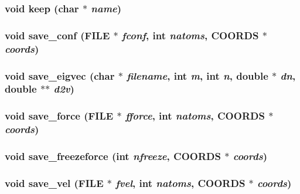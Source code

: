 \subsubsection{\setlength{\rightskip}{0pt plus 5cm}void keep (char $\ast$ {\em name})}\label{md__saveout_8c_6ece60b4480b943ce5405df2b24cc209}


\subsubsection{\setlength{\rightskip}{0pt plus 5cm}void save\_\-conf (FILE $\ast$ {\em fconf}, int {\em natoms}, {\bf COORDS} $\ast$ {\em coords})}\label{md__saveout_8c_b3f2a9aafdc9a3869217d76b4a618836}


\subsubsection{\setlength{\rightskip}{0pt plus 5cm}void save\_\-eigvec (char $\ast$ {\em filename}, int {\em m}, int {\em n}, double $\ast$ {\em dn}, double $\ast$$\ast$ {\em d2v})}\label{md__saveout_8c_be468be4405a40ab394023e376edffff}


\subsubsection{\setlength{\rightskip}{0pt plus 5cm}void save\_\-force (FILE $\ast$ {\em fforce}, int {\em natoms}, {\bf COORDS} $\ast$ {\em coords})}\label{md__saveout_8c_25bc9475fb6e336ef88f3066cb52fbdd}


\subsubsection{\setlength{\rightskip}{0pt plus 5cm}void save\_\-freezeforce (int {\em nfreeze}, {\bf COORDS} $\ast$ {\em coords})}\label{md__saveout_8c_dbbdf83279174d564c6cff04d43016c8}


\subsubsection{\setlength{\rightskip}{0pt plus 5cm}void save\_\-vel (FILE $\ast$ {\em fvel}, int {\em natoms}, {\bf COORDS} $\ast$ {\em coords})}\label{md__saveout_8c_c8dc064980acf6553ee892c0bc3b7d3a}


